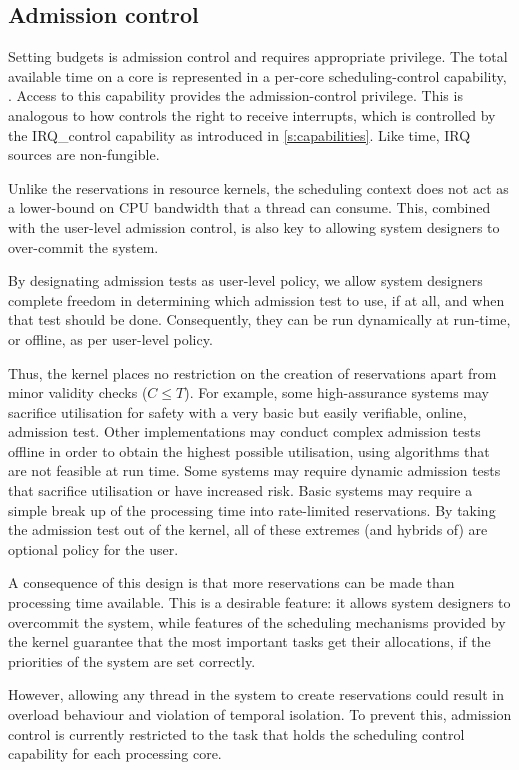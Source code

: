 \subsection{Admission control}
\label{sec:model-admission}

Setting budgets is admission control and requires appropriate
privilege. The total available time on a core is represented in a
per-core scheduling-control capability, .
Access to this capability provides the admission-control
privilege. This is analogous to how \selfour controls the right
to receive interrupts, which is controlled by the IRQ\_control
capability as introduced in \cref{s:capabilities}. Like time, IRQ sources are non-fungible.

Unlike the reservations in resource kernels, the scheduling context does not 
act as a lower-bound on CPU bandwidth that a thread can consume. This, combined with the
user-level admission control, is also key to allowing system designers to over-commit the system. 

By designating admission tests as user-level policy, we allow system designers complete freedom
in determining which admission test to use, if at all, and when that test should be done.
Consequently, they can be run dynamically at run-time, or offline, as per user-level policy.

Thus, the kernel places no restriction on the creation of reservations apart from minor validity
checks (\ie $C \leq T$).
For example, some high-assurance systems may sacrifice utilisation for safety with a very basic but easily verifiable, online, admission test.
Other implementations may conduct complex admission tests offline in order to obtain the highest possible utilisation, using algorithms that are not feasible at run time.
Some systems may require dynamic admission tests that sacrifice utilisation or have increased risk.
Basic systems may require a simple break up of the processing time into rate-limited reservations.
By taking the admission test out of the kernel, all of these extremes (and hybrids of) are optional policy for the user.

A consequence of this design is that more reservations can be made than processing time available.
This is a desirable feature: it allows system designers to overcommit the system, while features of the scheduling mechanisms provided by the kernel guarantee that the most important tasks get their allocations, if the priorities of the system are set correctly.

However, allowing any thread in the system to create reservations could result in overload behaviour and violation of temporal isolation.
To prevent this, admission control is currently restricted to the task that holds the scheduling
control capability for each processing core.

